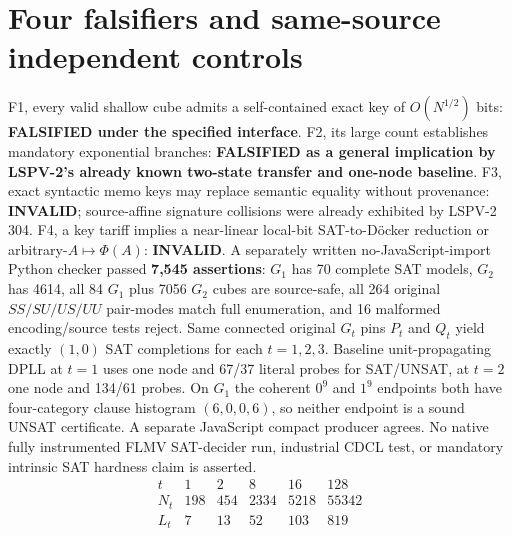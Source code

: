 \documentclass[10pt]{article}
\begin{document}
\section{Four falsifiers and same-source independent controls}
F1, every valid shallow cube admits a self-contained exact key of $O(N^{1/2})$ bits: \textbf{FALSIFIED under the specified interface}. F2, its large count establishes mandatory exponential branches: \textbf{FALSIFIED as a general implication by LSPV-2's already known two-state transfer and one-node baseline}. F3, exact syntactic memo keys may replace semantic equality without provenance: \textbf{INVALID}; source-affine signature collisions were already exhibited by LSPV-2 304. F4, a key tariff implies a near-linear local-bit SAT-to-D\"ocker reduction or arbitrary-$A\mapsto\Phi(A)$: \textbf{INVALID}.
A separately written no-JavaScript-import Python checker passed \textbf{7,545 assertions}: $G_1$ has 70 complete SAT models, $G_2$ has 4614, all 84 $G_1$ plus 7056 $G_2$ cubes are source-safe, all 264 original $SS/SU/US/UU$ pair-modes match full enumeration, and 16 malformed encoding/source tests reject. Same connected original $G_t$ pins $P_t$ and $Q_t$ yield exactly $(1,0)$ SAT completions for each $t=1,2,3$. Baseline unit-propagating DPLL at $t=1$ uses one node and 67/37 literal probes for SAT/UNSAT, at $t=2$ one node and 134/61 probes. On $G_1$ the coherent $0^9$ and $1^9$ endpoints both have four-category clause histogram $(6,0,0,6)$, so neither endpoint is a sound UNSAT certificate. A separate JavaScript compact producer agrees. No native fully instrumented FLMV SAT-decider run, industrial CDCL test, or mandatory intrinsic SAT hardness claim is asserted.
\[
\begin{array}{c|rrrrr}
t&1&2&8&16&128\\ \hline
N_t&198&454&2334&5218&55342\\
L_t&7&13&52&103&819
\end{array}
\]
\end{document}
